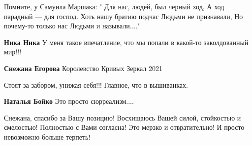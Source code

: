 \begin{itemize}
\obeycr
Помните, у Самуила Маршака:
" Для нас, людей, был черный ход,
А ход парадный — для господ.
Хоть нашу братию подчас
Людьми не признавали,
Но почему-то только нас
Людьми и называли...."
\restorecr

\begin{itemize}
 
\textbf{Ника Ника} У меня такое впечатление, что мы попали в какой-то заколдованный мир!!!

 
\textbf{Снежана Егорова} Королевство Кривых Зеркал 2021
\end{itemize}

 
Стоят за забором, унижая себя!!! Главное, что в вышиванках.

\begin{itemize}
 
\textbf{Наталья Бойко} Это просто сюрреализм....
\end{itemize}

 

Снежана, спасибо за Вашу позицию! Восхищаюсь Вашей силой, стойкостью и
смелостью! Полностью с Вами согласна! Это мерзко и отвратительно! И просто
невозможно больше терпеть!


\end{itemize}
